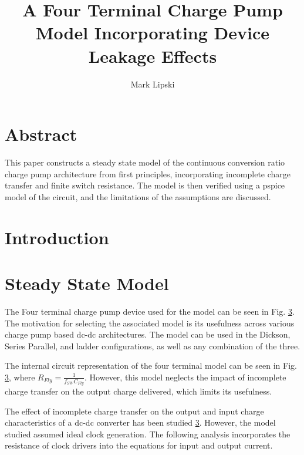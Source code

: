 \documentclass[conference]{IEEEtran}
\title{A Four Terminal Charge Pump Model Incorporating Device Leakage Effects}
\author{Mark Lipski}
\begin{document}
	\maketitle
	\section{Abstract}
	This paper constructs a steady state model of the continuous conversion ratio charge pump architecture from first principles, incorporating incomplete charge transfer and finite switch resistance. The model is then verified using a pspice model of the circuit, and the limitations of the assumptions are discussed.
	\section{Introduction}
	
	
	\section{Steady State Model}
	The Four terminal charge pump device used for the model can be seen in Fig. \ref{}. The motivation for selecting the associated model is its usefulness across various charge pump based dc-dc architectures. The model can be used in the Dickson, Series Parallel, and ladder configurations, as well as any combination of the three. 
	
	The internal circuit representation of the four terminal model can be seen in Fig. \ref{}, where $R_{Fly} = \frac{1}{f_{SW}C_{Fly}}$. However, this model neglects the impact of incomplete charge transfer on the output charge delivered, which limits its usefulness.
	
	The effect of incomplete charge transfer on the output and input charge characteristics of a dc-dc converter has been studied \ref{}. However, the model studied assumed ideal clock generation. The following analysis incorporates the resistance of clock drivers into the equations for input and output current. 
	
\end{document}
